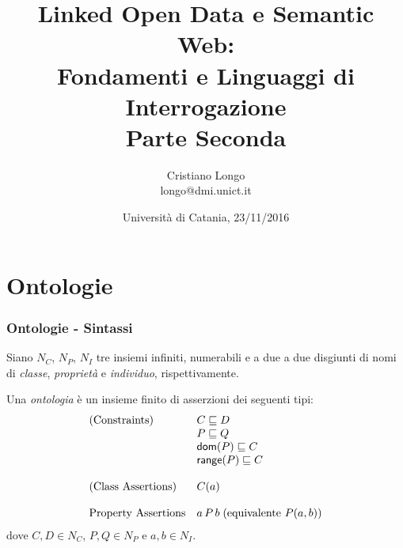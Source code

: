 \documentclass[8pt]{beamer}
\title{Linked Open Data e Semantic Web:\\
Fondamenti e Linguaggi di Interrogazione\\
Parte Seconda}
\author{Cristiano Longo\\ 
{\small{longo@dmi.unict.it}}}
\date{Universit\`a di Catania, 23/11/2016}
\begin{document}
\maketitle
\setcounter{tocdepth}{1}

\newcommand{\CNames}{N_C}
\newcommand{\PNames}{N_P}
\newcommand{\INames}{N_I}
\newcommand{\VNames}{V}
\newcommand{\DNames}{N_D}
\newcommand{\LNames}{N_L}
\newcommand{\BlankNodes}{\mathcal{B}}
\newcommand{\IRI}{IRI}


\newcommand{\Ont}{\mathcal{O}}
\newcommand{\Ontp}{\mathcal{O'}}

\newcommand{\datatypes}{\mathcal{D}}
\newcommand{\stringLiteral}[1]{\mbox{``#1''}}
\newcommand{\literal}[2]{\mbox{``#1''\textasciicircum\textasciicircum\url{#2}}} %
\newcommand{\literals}{\mathcal{L}}
\newcommand{\Vocab}{\mathcal{V}}

\section{Ontologie}

\begin{frame}
 \frametitle{Ontologie - Sintassi}

Siano $\CNames$, $\PNames$, $\INames$ tre insiemi infiniti, numerabili e 
a due a due disgiunti di nomi di \emph{classe}, \emph{propriet\`a} e \emph{individuo},
rispettivamente.
\vspace{\baselineskip}

Una \emph{ontologia} \`e un insieme finito di asserzioni dei seguenti tipi:
\[
 \begin{array}{ll}
  \mbox{(Constraints)} & C \sqsubseteq D\\
  & P \sqsubseteq Q \\
  & \mathsf{dom}(P) \sqsubseteq C \\
  & \mathsf{range}(P) \sqsubseteq C \\
  &\\
  \mbox{(Class Assertions)} & C(a)\\
  &\\
  \mbox{Property Assertions} & a\,P\,b\;(\mbox{equivalente }P(a,b))\\
 \end{array}
\]
dove $C, D \in \CNames$, $P, Q \in \PNames$ e $a, b \in \INames$.
\end{frame}
\end{document}
